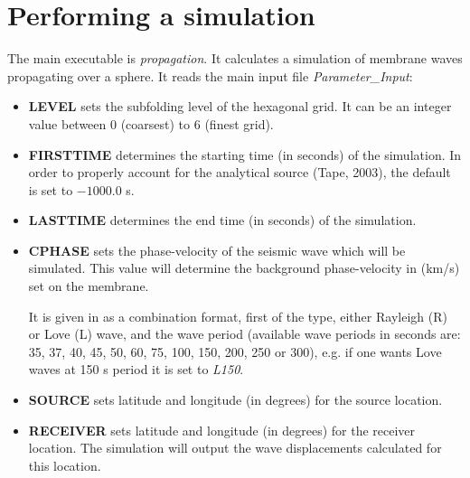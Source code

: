 \documentclass[a4paper,
                          headsepline,
                          listof=totoc,
                          toc=listof,
                          headings=small]{scrreprt} %
\begin{document}
\chapter{Performing a simulation}
The main executable is \textit{propagation}.
It calculates a simulation of membrane waves propagating over a sphere.
It reads the main input file \textit{Parameter\_Input}:
\\
\begin{itemize}
\item{\textbf{LEVEL}} 
sets the subfolding level of the hexagonal grid. It can be an integer value
between $0$ (coarsest) to $6$ (finest grid). 

\item \textbf{FIRSTTIME} 
determines the starting time (in seconds) of the simulation. In order to properly account for the analytical source (Tape, 2003), the default is set to $-1000.0$ s.

\item \textbf{LASTTIME} 
determines the end time (in seconds) of the simulation.

\item \textbf{CPHASE} 
sets the phase-velocity of the seismic wave which will be simulated. This value
will determine the background phase-velocity in (km/s) set on the membrane. 

It is given in as a combination format, first of the type, either Rayleigh (R) or Love (L) wave, and the wave period (available wave periods in seconds are: 35, 37, 40, 45, 50, 60, 75, 100, 150, 200, 250 or 300), e.g. if one wants Love waves at 150 s period it is set to \textit{L150}.

\item \textbf{SOURCE} 
sets latitude and longitude (in degrees) for the source location.

\item \textbf{RECEIVER} 
sets latitude and longitude (in degrees) for the receiver location. 
The simulation will output the wave displacements calculated for this location.



\end{itemize}
\end{document}
